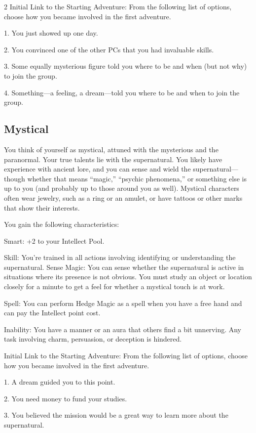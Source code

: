 \begin{multicols}{2}
Initial Link to the Starting Adventure: From the following list of options, choose how you became involved in the first adventure.

1. You just showed up one day.

2. You convinced one of the other PCs that you had invaluable skills.

3. Some equally mysterious figure told you where to be and when (but not why) to join the group.

4. Something—a feeling, a dream—told you where to be and when to join the group.

\subsection{Mystical}

You think of yourself as mystical, attuned with the mysterious and the paranormal. Your true talents lie with the supernatural. You likely have experience with ancient lore, and you can sense and wield the supernatural—though whether that means “magic,” “psychic phenomena,” or something else is up to you (and probably up to those around you as well). Mystical characters often wear jewelry, such as a ring or an amulet, or have tattoos or other marks that show their interests. 

You gain the following characteristics:

Smart: +2 to your Intellect Pool. 

Skill: You’re trained in all actions involving identifying or understanding the supernatural.
Sense Magic: You can sense whether the supernatural is active in situations where its presence is not obvious. You must study an object or location closely for a minute to get a feel for whether a mystical touch is at work.

Spell: You can perform Hedge Magic as a spell when you have a free hand and can pay the Intellect point cost.

Inability: You have a manner or an aura that others find a bit unnerving. Any task involving charm, persuasion, or deception is hindered.

Initial Link to the Starting Adventure: From the following list of options, choose how you became involved in the first adventure.

1. A dream guided you to this point.

2. You need money to fund your studies.

3. You believed the mission would be a great way to learn more about the supernatural.


\end{multicols}
